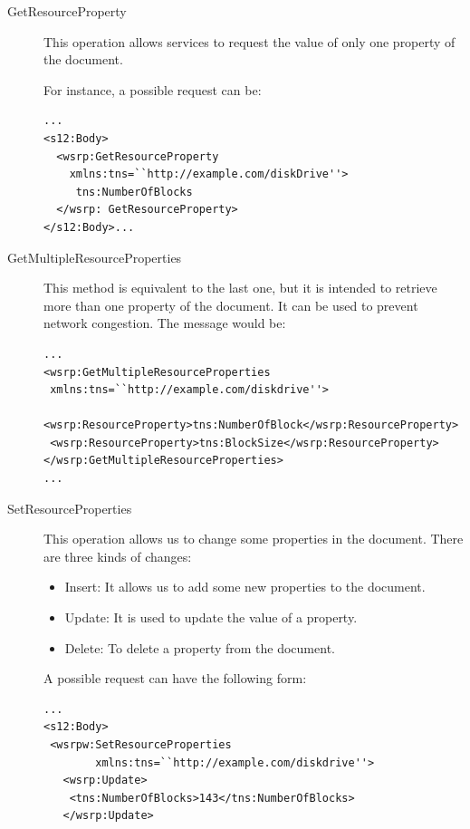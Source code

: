 \begin{description}
\item[GetResourceProperty]
This operation allows services to request 
the value of only one property of the document.

For instance, a possible request can be:


\begin{lstlisting}
...
<s12:Body>
  <wsrp:GetResourceProperty 
    xmlns:tns=``http://example.com/diskDrive''>
     tns:NumberOfBlocks
  </wsrp: GetResourceProperty>
</s12:Body>...
\end{lstlisting}

\item[GetMultipleResourceProperties]
This method is equivalent to the last one, but it is intended to retrieve
more than one property of the document. 
It can be used to prevent network congestion. The message would be:

\lstset{language=XML, numbersep=5pt,basicstyle=\scriptsize ,frame=single}
\begin{lstlisting}
...
<wsrp:GetMultipleResourceProperties
 xmlns:tns=``http://example.com/diskdrive''>
 <wsrp:ResourceProperty>tns:NumberOfBlock</wsrp:ResourceProperty>
 <wsrp:ResourceProperty>tns:BlockSize</wsrp:ResourceProperty>
</wsrp:GetMultipleResourceProperties>
...
\end{lstlisting}

\item[SetResourceProperties]
This operation allows us to change some properties in the document. There are three kinds of changes:

\begin{itemize}
\item Insert: It allows us to add some new properties to the document.
\item Update: It is used to update the value of a property.
\item Delete: To delete a property from the document.
\end{itemize}

A possible request can have the following form:

\begin{lstlisting}
...
<s12:Body>
 <wsrpw:SetResourceProperties
        xmlns:tns=``http://example.com/diskdrive''>
   <wsrp:Update>
    <tns:NumberOfBlocks>143</tns:NumberOfBlocks>
   </wsrp:Update>


\end{lstlisting}
\end{description}
